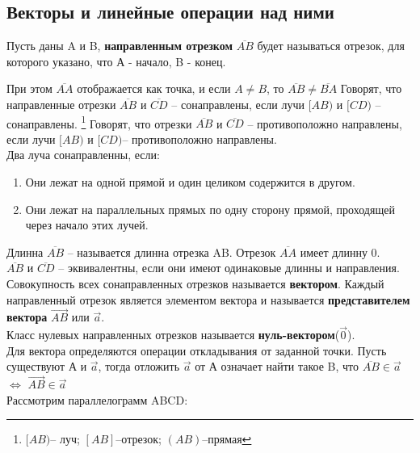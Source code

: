 \documentclass[oneside]{book}
\begin{document}
\begin{enumerate}
\begin{itemize}
\begin{enumerate}
\setcounter{chapter}{39}
\chapter{Векторы и линейные операции над ними}

	Пусть даны A и B,  \textbf{направленным отрезком} $\overline{AB}$ будет называться отрезок, для которого указано, что А - начало, B - конец. 
	
	При этом $\overline {AA}$ отображается как точка, и если $A\ne B$, то $\overline {AB} \ne \overline {BA}$
	Говорят, что направленные отрезки $\overline {AB}$ и $\overline {CD}$ -- сонаправлены, если лучи $[AB)$ и $[CD)$ -- сонаправлены. \footnote{$[AB)$-- луч; $[AB]$--отрезок; $(AB)$--прямая}
	Говорят, что отрезки $\overline {AB}$ и $\overline {CD}$ -- противоположно направлены, если лучи $[AB)$ и $[CD)$-- противоположно направлены.\\
	
	Два луча сонаправленны, если:
	\begin{enumerate}
		\item Они лежат на одной прямой и один целиком содержится в другом.
		\item Они лежат на параллельных прямых по одну сторону прямой, проходящей через начало этих лучей.
	\end{enumerate}
Длинна $\overline {AB}$ -- называется длинна отрезка AB. Отрезок $\overline {AA}$ имеет длинну 0.\\
$\overline {AB}$ и $\overline {CD}$ -- эквивалентны, если они имеют одинаковые длинны и направления. Совокупность всех сонаправленных отрезков называется \textbf{вектором}. Каждый направленный отрезок является элементом вектора и называется \textbf{представителем вектора} $\vec{AB}$ или $\vec{a}$.\\
Класс нулевых направленных отрезков называется \textbf{нуль-вектором}($\vec{0}$).\\
Для вектора определяются операции откладывания от заданной точки. Пусть существуют А и $\vec{a}$, тогда отложить $\vec{a}$ от А означает найти такое B, что $\overline{AB} \in \vec{a}$ $\iff$ $\vec{AB} \in \vec{a}$\\ 
Рассмотрим параллелограмм ABCD:
\end{enumerate}
\end{itemize}
\end{enumerate}
\end{document}
